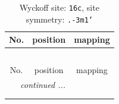 \documentclass[fleqn,8pt]{jsarticle}
\begin{document}
\renewcommand{\arraystretch}{1.2}
\begin{longtable}{ccc}
\caption{Wyckoff site: {\tt 16c}, site symmetry: {\tt .-3m1'}}
 \\
 \hline \hline
No. & position & mapping \\ \hline \endfirsthead

\multicolumn{2}{l}{\tablename\ \thetable{}} \\
 \hline \hline
No. & position & mapping \\ \hline \endhead

 \hline \hline
\multicolumn{2}{r}{\footnotesize\it continued ...} \\ \endfoot

 \hline \hline
\multicolumn{2}{r}{} \\ \endlastfoot


\end{longtable}
\end{document}
